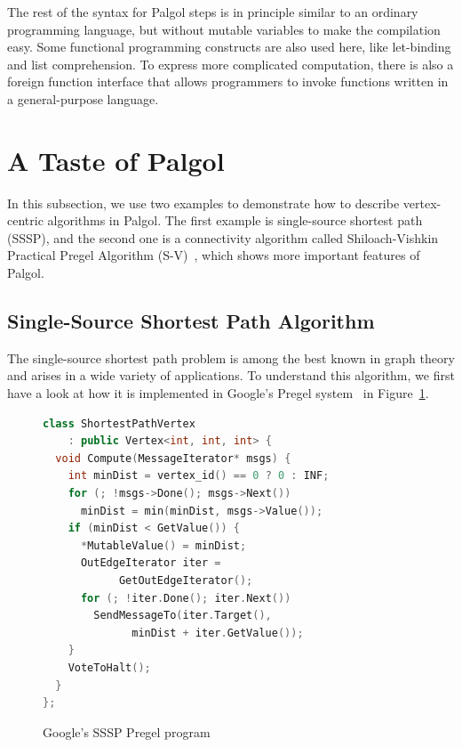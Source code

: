 \documentclass{sokendai_thesis} %
\begin{document}
The rest of the syntax for Palgol steps is in principle similar to an ordinary programming language, but without mutable variables to make the compilation easy.
Some functional programming constructs are also used here, like let-binding and list comprehension.
To express more complicated computation, there is also a foreign function interface that allows programmers to invoke functions written in a general-purpose language.

\section{A Taste of Palgol}
\label{sec:taste}

In this subsection, we use two examples to demonstrate how to describe vertex-centric algorithms in Palgol.
The first example is single-source shortest path (SSSP), and the second one is a connectivity algorithm called Shiloach-Vishkin Practical Pregel Algorithm (S-V)~\cite{connectivity}, which shows more important features of Palgol.

\subsection{Single-Source Shortest Path Algorithm}
\label{sec:sssp}

The single-source shortest path problem is among the best known in graph theory and arises in a wide variety of applications.
To understand this algorithm, we first have a look at how it is implemented in Google's Pregel system~\cite{pregel} in Figure~\ref{fig:sssp-pregel}.
\begin{figure}[thp]
\vspace{-2ex}
\begin{lstlisting}[basicstyle=\footnotesize,numbers=none,xleftmargin=0em,language=c++]
class ShortestPathVertex
    : public Vertex<int, int, int> {
  void Compute(MessageIterator* msgs) {
    int minDist = vertex_id() == 0 ? 0 : INF;
    for (; !msgs->Done(); msgs->Next())
      minDist = min(minDist, msgs->Value());
    if (minDist < GetValue()) {
      *MutableValue() = minDist;
      OutEdgeIterator iter = 
            GetOutEdgeIterator();
      for (; !iter.Done(); iter.Next())
        SendMessageTo(iter.Target(),
              minDist + iter.GetValue());
    }
    VoteToHalt();
  }
};
\end{lstlisting}
\vspace{-2ex}
\caption{Google's SSSP Pregel program~\protect\cite{pregel}}
\label{fig:sssp-pregel}
\end{figure}
\end{document}
